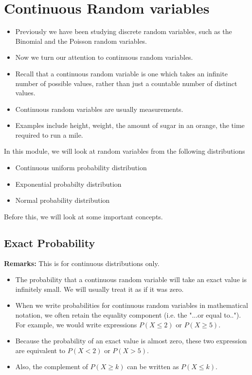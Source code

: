 \documentclass[a4paper,12pt]{article}
\begin{document}
	
\section*{Continuous Random variables}
\begin{itemize}
\item Previously we have been studying discrete random variables, such as the Binomial and the Poisson random variables.
\item Now we turn our attention to continuous random variables.
\item Recall that a continuous random variable is one which takes an infinite number of possible values, rather than just a countable number of distinct values.
\item Continuous random variables are usually measurements.
\item Examples include height, weight, the amount of sugar in an orange, the time required to run a mile.
\end{itemize}


	In this module, we will look at random variables from the following distributions
	\begin{itemize}
		\item  Continuous uniform probability distribution
		\item  Exponential probabilty distribution
		\item  Normal probability distribution
	\end{itemize}
	
	Before this, we will look at some important concepts.


\subsection{Exact Probability}

\begin{framed}
\noindent \textbf{Remarks:} This is for continuous distributions only.
\begin{itemize}
\item The probability that a continuous random variable will take an exact value is infinitely small.
We will usually treat it as if it was zero.
\item
When we write probabilities for continuous random variables in mathematical notation, we often retain the equality component (i.e. the "...or equal to..").\\
For example, we would write expressions $P(X \leq 2)$ or $P(X \geq 5)$.
\item
Because the probability of an exact value is almost zero, these two expression are equivalent to $P(X < 2)$
or $P(X > 5)$. \item Also, the complement of $P(X \geq k)$ can be written as $P(X \leq k)$.
\end{itemize}
\end{framed}
\end{document}
